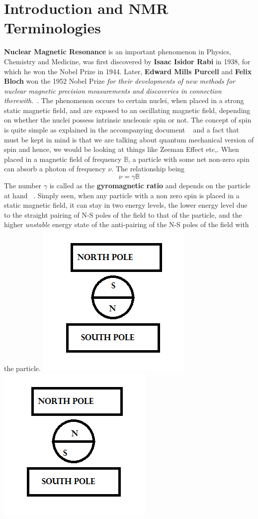 \documentclass[12pt]{article}
\begin{document}
\section{Introduction and NMR Terminologies}
\textbf{Nuclear Magnetic Resonance} is an important phenomenon in Physics, Chemistry and Medicine, was first discovered by \textbf{Isaac Isidor Rabi} in 1938, for which he won the Nobel Prize in 1944. Later, \textbf{Edward Mills Purcell} and \textbf{Felix Bloch} won the 1952 Nobel Prize \textit{for their developments of new methods for nuclear magnetic precision measurements and discoveries in connection therewith}.~\cite{npb}. The phenomenon occurs to certain nuclei, when placed in a strong static magnetic field, and are exposed to an oscillating magnetic field, depending on whether the nuclei possess intrinsic nucleonic spin or not. The concept of spin is quite simple as explained in the accompanying document ~\cite{me} and a fact that must be kept in mind is that we are talking about quantum mechanical version of spin and hence, we would be looking at things like Zeeman Effect etc,. When placed in a magnetic field of frequency $\mathbb{B}$, a particle with some net non-zero spin can absorb a photon of frequency $\nu$. The relationship being $$\nu = \gamma\mathbb{B}$$ The number $\gamma$ is called as the \textbf{gyromagnetic ratio} and depends on the particle at hand ~\cite{jph}. Simply seen, when any particle with a non zero spin is placed in a static magnetic field, it can stay in two energy levels, the lower energy level due to the straight pairing of N-S poles of the field to that of the particle, and the higher \textit{unstable} energy state of the anti-pairing of the N-S poles of the field with the particle.
\includegraphics[scale=0.9]{nsns.png}
\includegraphics[scale=0.9]{nnss.png}
\end{document}
